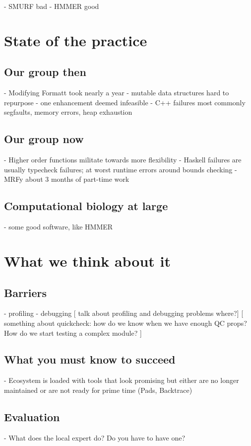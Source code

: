\documentclass[preprint]{sigplanconf}
\begin{document}
 - SMURF bad
 - HMMER good
 
\section{State of the practice}

\subsection{Our group then}
 - Modifying Formatt took nearly a year
 - mutable data structures hard to repurpose
 - one enhancement deemed infeasible
 - C++ failures most commonly segfaults, memory errors, heap exhaustion

\subsection{Our group now}
 - Higher order functions militate towards more flexibility
 - Haskell failures are usually typecheck failures; at worst runtime errors around bounds checking
 - MRFy about 3 months of part-time work

\subsection{Computational biology at large}
 - some good software, like HMMER

\section{What we think about it}

\subsection{Barriers}

- profiling
- debugging
 [ talk about profiling and debugging problems where?]
[ something about quickcheck: how do we know when we have enough QC props? How do we start testing a complex module? ]

\subsection{What you must know to succeed}
- Ecosystem is loaded with tools that look promising but either are no longer maintained or are not ready for prime time (Pads, Backtrace)

\subsection{Evaluation}
- What does the local expert do? Do you have to have one?
\end{document}
